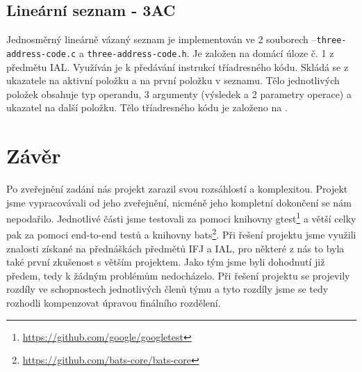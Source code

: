 \documentclass[12pt]{article}
\begin{document}
            \newpage
        \subsection{Lineární seznam - 3AC}
            Jednosměrný lineárně vázaný seznam je implementován ve 2 souborech --\break \verb!three-address-code.c! a \verb!three-address-code.h!. Je založen na do\-mácí úloze č. 1 z předmětu IAL. Využíván je k předávání instrukcí tříadresného kódu. Skládá se z ukazatele na aktivní položku a na první položku v seznamu. Tělo jednotlivých položek obsahuje typ operandu, 3 argumenty (výsledek a 2 parametry operace) a ukazatel na další položku. Tělo tříadresného kódu je založeno na \cite{DragonBook}.

        \section{Závěr}
            Po zveřejnění zadání nás projekt zarazil svou rozsáhlostí a komplexitou. Projekt jsme vypracovávali od jeho zveřejnění, nicméně jeho kompletní dokončení se nám nepodařilo. Jednotlivé části jsme testovali za pomoci knihovny gtest\footnote{\url{https://github.com/google/googletest}} a větší celky pak za pomoci end-to-end testů a knihovny  bats\footnote{\url{https://github.com/bats-core/bats-core}}. Při řešení projektu jsme využili znalosti získané na přednáškách předmětů IFJ a IAL, pro některé z nás to byla také první zkušenost s větším projektem. Jako tým jsme byli dohodnutí již předem, tedy k žádným problémům nedocházelo. Při řešení projektu se projevily rozdíly ve schopnostech jednotlivých členů týmu a tyto rozdíly jsme se tedy rozhodli kompenzovat úpravou finálního rozdělení.
    
\end{document}
